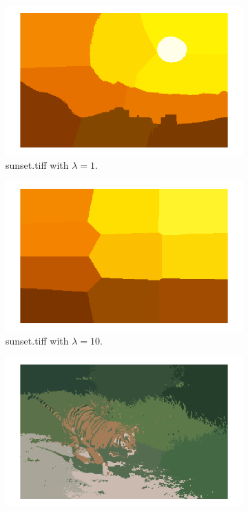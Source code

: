 \documentclass[12pt]{report}
\begin{document}
\begin{enumerate}
  \begin{figure}[H]
    \centering
    \begin{subfigure}{0.48\linewidth}
      \includegraphics[width=\linewidth]{1b1.png}
      \caption{sunset.tiff with \( \lambda=1\).}
    \end{subfigure}
    \begin{subfigure}{0.48\linewidth}
      \includegraphics[width=\linewidth]{1b10.png}
      \caption{sunset.tiff with \( \lambda=10\).}
    \end{subfigure}
    \begin{subfigure}{0.48\linewidth}
      \includegraphics[width=\linewidth]{2b1.png}

\end{subfigure}
\end{figure}
\end{enumerate}
\end{document}
